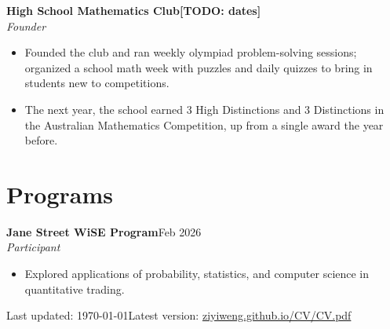 \documentclass[11pt,letterpaper]{article}
\newcommand{\entry}[4]{%
  \par\vspace{3pt}\noindent
  \textbf{#1}\hfill #2\\
  \textit{#3}\hfill\textit{#4}\par}
\newcommand{\sep}{\quad\textperiodcentered\quad}
\newcommand{\todo}[1]{\textbf{[TODO: #1]}}
\begin{document}
\entry{High School Mathematics Club}{\todo{dates}}{Founder}{}
\begin{itemize}
  \item Founded the club and ran weekly olympiad problem-solving sessions; organized a school math
        week with puzzles and daily quizzes to bring in students new to competitions.
  \item The next year, the school earned 3 High Distinctions and 3 Distinctions in the Australian
        Mathematics Competition, up from a single award the year before.
\end{itemize}

\section*{Programs}
\entry{Jane Street WiSE Program}{Feb 2026}{Participant}{}
\begin{itemize}
  \item Explored applications of probability, statistics, and computer science in quantitative trading.
\end{itemize}

\vfill
\begin{center}\footnotesize\color{gray}
  Last updated: \today\sep Latest version: \href{https://ziyiweng.github.io/CV/CV.pdf}{ziyiweng.github.io/CV/CV.pdf}
\end{center}
\end{document}
